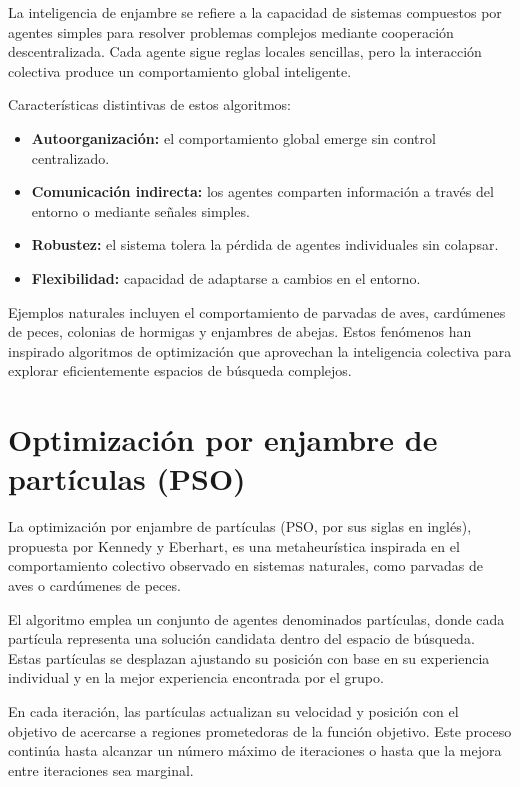 La inteligencia de enjambre se refiere a la capacidad de sistemas
compuestos por agentes simples para resolver problemas complejos
mediante cooperación descentralizada. Cada agente sigue reglas
locales sencillas, pero la interacción colectiva produce un
comportamiento global inteligente.

Características distintivas de estos algoritmos:

\begin{itemize}
  \item \textbf{Autoorganización:} el comportamiento global emerge
    sin control centralizado.
  \item \textbf{Comunicación indirecta:} los agentes comparten
    información a través del entorno o mediante señales simples.
  \item \textbf{Robustez:} el sistema tolera la pérdida de agentes
    individuales sin colapsar.
  \item \textbf{Flexibilidad:} capacidad de adaptarse a cambios en
    el entorno.
\end{itemize}

Ejemplos naturales incluyen el comportamiento de parvadas de aves,
cardúmenes de peces, colonias de hormigas y enjambres de abejas.
Estos fenómenos han inspirado algoritmos de optimización que
aprovechan la inteligencia colectiva para explorar eficientemente
espacios de búsqueda complejos.

\section{Optimización por enjambre de partículas (PSO)}

La optimización por enjambre de partículas (PSO, por sus siglas en
inglés), propuesta por Kennedy y Eberhart, es una metaheurística
inspirada en el comportamiento colectivo observado en sistemas
naturales, como parvadas de aves o cardúmenes de peces.

El algoritmo emplea un conjunto de agentes denominados partículas,
donde cada partícula representa una solución candidata dentro del
espacio de búsqueda. Estas partículas se desplazan ajustando su
posición con base en su experiencia individual y en la mejor
experiencia encontrada por el grupo.

En cada iteración, las partículas actualizan su velocidad y posición
con el objetivo de acercarse a regiones prometedoras de la función
objetivo. Este proceso continúa hasta alcanzar un número máximo de
iteraciones o hasta que la mejora entre iteraciones sea marginal.

